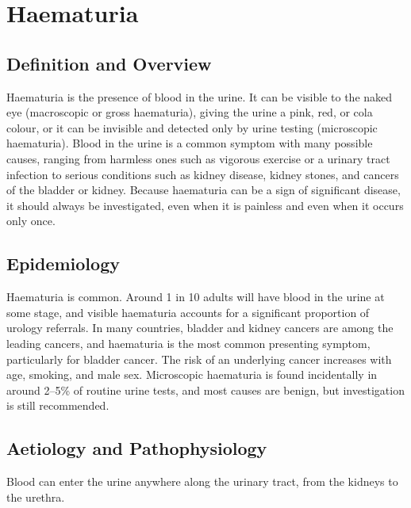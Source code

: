 \chapter{Haematuria}

\section*{Definition and Overview}
Haematuria is the presence of blood in the urine. It can be visible to the naked eye (macroscopic or gross haematuria), giving the urine a pink, red, or cola colour, or it can be invisible and detected only by urine testing (microscopic haematuria). Blood in the urine is a common symptom with many possible causes, ranging from harmless ones such as vigorous exercise or a urinary tract infection to serious conditions such as kidney disease, kidney stones, and cancers of the bladder or kidney. Because haematuria can be a sign of significant disease, it should always be investigated, even when it is painless and even when it occurs only once.

\section*{Epidemiology}
Haematuria is common. Around 1 in 10 adults will have blood in the urine at some stage, and visible haematuria accounts for a significant proportion of urology referrals. In many countries, bladder and kidney cancers are among the leading cancers, and haematuria is the most common presenting symptom, particularly for bladder cancer. The risk of an underlying cancer increases with age, smoking, and male sex. Microscopic haematuria is found incidentally in around 2--5\% of routine urine tests, and most causes are benign, but investigation is still recommended.

\section*{Aetiology and Pathophysiology}
Blood can enter the urine anywhere along the urinary tract, from the kidneys to the urethra.

